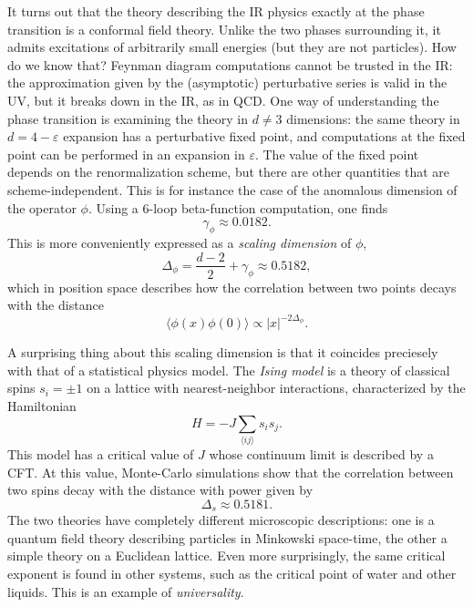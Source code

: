 \documentclass[a4paper,12pt]{article}
\numberwithin{equation}{section}
\begin{document}
\begin{itemize}
It turns out that the theory describing the IR physics exactly at the phase transition is a conformal field theory. Unlike the two phases surrounding it, it admits excitations of arbitrarily small energies (but they are not particles). How do we know that? Feynman diagram computations cannot be trusted in the IR: the approximation given by the (asymptotic) perturbative series is valid in the UV, but it breaks down in the IR, as in QCD. One way of understanding the phase transition is examining the theory in $d \neq 3$ dimensions: the same theory in $d = 4 - \varepsilon$ expansion has a perturbative fixed point, and computations at the fixed point can be performed in an expansion in $\varepsilon$. The value of the fixed point depends on the renormalization scheme, but there are other quantities that are scheme-independent. This is for instance the case of the anomalous dimension of the operator $\phi$.
Using a 6-loop beta-function computation, one finds
\begin{equation}
	\gamma_\phi \approx 0.0182.
\end{equation}
This is more conveniently expressed as a \emph{scaling dimension} of $\phi$,
\begin{equation}
	\Delta_\phi = \frac{d-2}{2} + \gamma_\phi \approx 0.5182,
\end{equation}
which in position space describes how the correlation between two points decays with the distance
\begin{equation}
	\langle \phi(x) \phi(0) \rangle \propto |x|^{-2\Delta_\phi}.
\end{equation}

A surprising thing about this scaling dimension is that it coincides preciesely with that of a statistical physics model. The \emph{Ising model} is a theory of classical spins $s_i = \pm 1$ on a lattice with nearest-neighbor interactions, characterized by the Hamiltonian
\begin{equation}
	H = - J \sum_{\langle ij \rangle} s_i s_j.
\end{equation}
This model has a critical value of $J$ whose continuum limit is described by a CFT. At this value, Monte-Carlo simulations show that the correlation between two spins decay with the distance with power given by
\begin{equation}
	\Delta_s \approx 0.5181.
\end{equation}
The two theories have completely different microscopic descriptions: one is a quantum field theory describing particles in Minkowski space-time, the other a simple theory on a Euclidean lattice. 
Even more surprisingly, the same critical exponent is found in other systems, such as the critical point of water and other liquids. This is an example of \emph{universality}.


\end{itemize}
\end{document}
